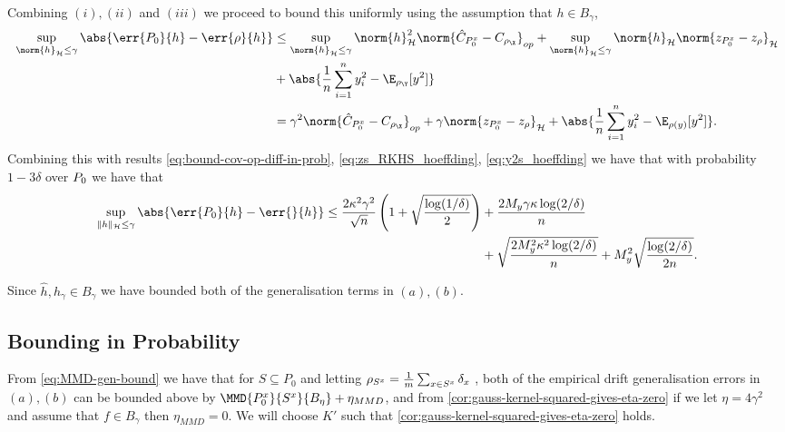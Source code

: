 Combining \((i), (ii)\) and \((iii)\) we proceed to bound this uniformly using
the assumption that \(h \in B_{\gamma}\),
\begin{align*}
  \sup_{\norm{h}_{\rkhs{H}} \leq \gamma} \abs{\err{\poolset_0}{h} - \err{\rho}{h}}  & \leq \sup_{\norm{h}_{\rkhs{H}} \leq \gamma} \norm{h}_{\rkhs{H}}^2\norm{\hat{C}_{\poolsetx_0} - C_{\rho_{\X}}}_{op}  + \sup_{\norm{h}_{\rkhs{H}} \leq \gamma} \norm{h}_{\rkhs{H}} \norm{z_{\poolsetx_0} - z_{\rho}}_{\rkhs{H}} \\
                                                                                    & + \abs{\frac{1}{n} \sum_{i=1}^n y_i^2 - \E_{\rho_{\Y}}[y^2]} \\
                                                                                    & = \gamma^2 \norm{\hat{C}_{\poolsetx_0} - C_{\rho_{\X}}}_{op} + \gamma \norm{z_{\poolsetx_0} - z_{\rho}}_{\rkhs{H}} + \abs{\frac{1}{n} \sum_{i=1}^n y_i^2 - \E_{\rho(y)}[y^2]}.
\end{align*}
Combining this with results
\ref{eq:bound-cov-op-diff-in-prob}, \ref{eq:zs_RKHS_hoeffding}, \ref{eq:y2s_hoeffding} we have that with probability \(1 - 3\delta\) over \(P_0\) we have that
\begin{equation}
\label{eq:uniform-bound-gen-error-over-ball}
\begin{split}
  \sup_{\|h\|_{\rkhs{H}} \leq \gamma} \abs{\err{\poolset_0}{h} -\err{}{h}} \leq
  \frac{2 \kappa^2 \gamma^2}{\sqrt{n}}  \left(1 + \sqrt{\frac{\log(1 / \delta)}{2}} \right) & + \frac{2 M_y \gamma \kappa \log(2/\delta)}{n}  \\
  & + \sqrt{\frac{2 M_y^2 \kappa^2 \log(2/\delta)}{n}} + M_y^2\sqrt{\frac{\log(2/\delta)}{2n}}.
\end{split}
\end{equation}

Since \(\hat{h}, h_{\gamma} \in B_{\gamma}\) we have bounded both of the
generalisation terms in \((a), (b)\).

\subsection{Bounding in Probability}
From \ref{eq:MMD-gen-bound} we have that for \(S \subseteq P_{0}\) and
letting \(\rho_{S^x} = \frac{1}{m} \sum_{x \in S^x}\delta_{x}\)
, both of the empirical drift generalisation errors in \((a), (b)\) can be
bounded above by \(\MMD{\poolsetx_{0}}{\trainsetx}{B_{\eta}} + \eta_{MMD}\),
and from \ref{cor:gauss-kernel-squared-gives-eta-zero} if we let \(\eta =
4\gamma^{2}\) and assume that \(f \in B_{\gamma}\) then \(\eta_{MMD} = 0\). We will choose \(K'\) such that
\ref{cor:gauss-kernel-squared-gives-eta-zero} holds.

